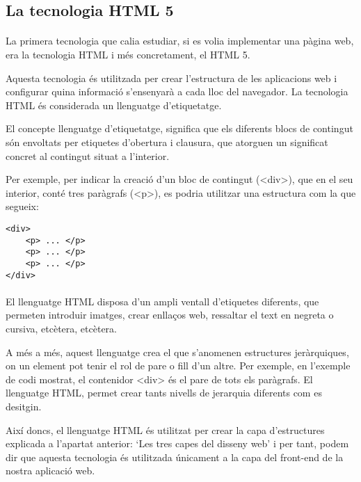 \subsection{La tecnologia HTML 5}

    \paragraph{}
    La primera tecnologia que calia estudiar, si es volia implementar una pàgina web, era la tecnologia HTML i més concretament, el HTML 5.

    Aquesta tecnologia és utilitzada per crear l’estructura de les aplicacions web i configurar quina informació s’ensenyarà a cada lloc del navegador. La tecnologia HTML és considerada un llenguatge d’etiquetatge.

    El concepte llenguatge d'etiquetatge, significa que els diferents blocs de contingut són envoltats per etiquetes d'obertura i clausura, que atorguen un significat concret al contingut situat a l'interior.

    Per exemple, per indicar la creació d’un bloc de contingut (<div>), que en el seu interior, conté tres paràgrafs (<p>), es podria utilitzar una estructura com la que segueix:

    \begin{lstlisting}[style=rawOwn,caption={Bloc de contingunts HTML amb tres paràgrafs}]
<div>
    <p> ... </p>
    <p> ... </p>
    <p> ... </p>
</div>
    \end{lstlisting}

    \paragraph{}
    El llenguatge HTML disposa d’un ampli ventall d’etiquetes diferents, que permeten introduir imatges, crear enllaços web, ressaltar el text en negreta o cursiva, etcètera, etcètera.

    A més a més, aquest llenguatge crea el que s’anomenen estructures jeràrquiques, on un element pot tenir el rol de pare o fill d’un altre. Per exemple, en l’exemple de codi mostrat, el contenidor <div> és el pare de tots els paràgrafs. El llenguatge HTML, permet crear tants nivells de jerarquia diferents com es desitgin.

    Així doncs, el llenguatge HTML és utilitzat per crear la capa d'estructures explicada a l'apartat anterior: `Les tres capes del disseny web' i per tant, podem dir que aquesta tecnologia és utilitzada únicament a la capa del front-end de la nostra aplicació web.
